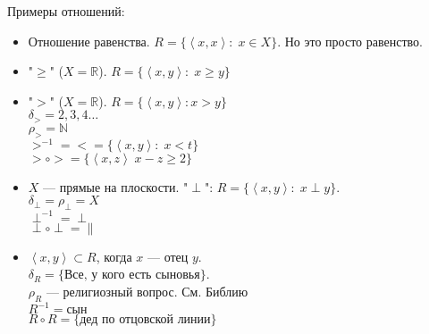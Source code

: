 \documentclass[12pt]{article}
\begin{document}
Примеры отношений:
\begin{itemize}
    \item Отношение равенства. $R = \{\left<x,x\right>: \; x \in X\}$. Но это просто равенство.
    \item "$\ge$" ($X = \mathbb{R}$). $R = \{ \left<x,y\right>: \; x \ge y\}$
    \item "$>$" ($X = \mathbb{R}$). $R = \{\left<x,y\right>: x > y\}$ \\
        $\delta_{>} = {2,3,4\ldots}$\\
        $\rho_> = \mathbb{N}$\\
        $>^{-1} = < = \{\left<x,y\right>: \; x < t\}$ \\
        $> \circ > = \{\left<x,z\right>\; x-z\ge2\}$
    \item $X$ --- прямые на плоскости. "$\perp$":  $R = \{\left<x,y\right>: \; x \perp y\}$. \\
            $\delta_\perp = \rho_\perp = X$ \\
            $\perp^{-1} = \perp$\\
            $\perp \circ \perp = \|$
    \item $\left<x, y\right> \subset R$, когда  $x$ --- отец  $y$. \\ 
        $\delta_R = \{\text{Все, у кого есть сыновья}\}$. \\
        $\rho_R$ --- религиозный вопрос. См. Библию \\
        $R^{-1} = \text{сын}$ \\
        $R \circ R = \{\text{дед по отцовской линии}\}$
\end{itemize}
\end{document}
